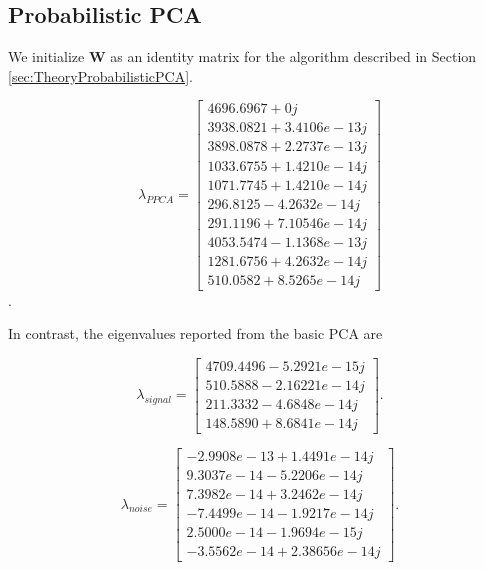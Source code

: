 \documentclass[letterpaper, 10 pt, conference]{ieeeconf}  %
\begin{document}
\subsection{Probabilistic PCA}
\label{sec:ExperimentsProbabilisticPCA}

We initialize $\bm{W}$ as an identity matrix for the algorithm described in Section \ref{sec:TheoryProbabilisticPCA}.

\begin{equation*}
\lambda_{PPCA} = \begin{bmatrix}
 4696.6967 + 0j\\
 3938.0821 +3.4106e-13j\\
 3898.0878 +2.2737e-13j\\
 1033.6755 +1.4210e-14j\\
 1071.7745 +1.4210e-14j\\
  296.8125 -4.2632e-14j\\
  291.1196 +7.10546e-14j\\
 4053.5474 -1.1368e-13j\\
 1281.6756 +4.2632e-14j\\
  510.0582 +8.5265e-14j\end{bmatrix}
   \end{equation*}.
  
In contrast, the eigenvalues reported from the basic PCA are

\begin{equation*}
\lambda_{signal} = \begin{bmatrix}
4709.4496 -5.2921e-15j\\   
510.5888 -2.16221e-14j\\
   211.3332 -4.6848e-14j\\   
   148.5890 +8.6841e-14j\end{bmatrix}.
\end{equation*}

\begin{equation*}
\lambda_{noise} = \begin{bmatrix}
-2.9908e-13 +1.4491e-14j\\  
9.3037e-14 -5.2206e-14j\\
   7.3982e-14 +3.2462e-14j\\ 
    -7.4499e-14 -1.9217e-14j\\
   2.5000e-14 -1.9694e-15j\\  
   -3.5562e-14 +2.38656e-14j\end{bmatrix}.
\end{equation*}
\end{document}
